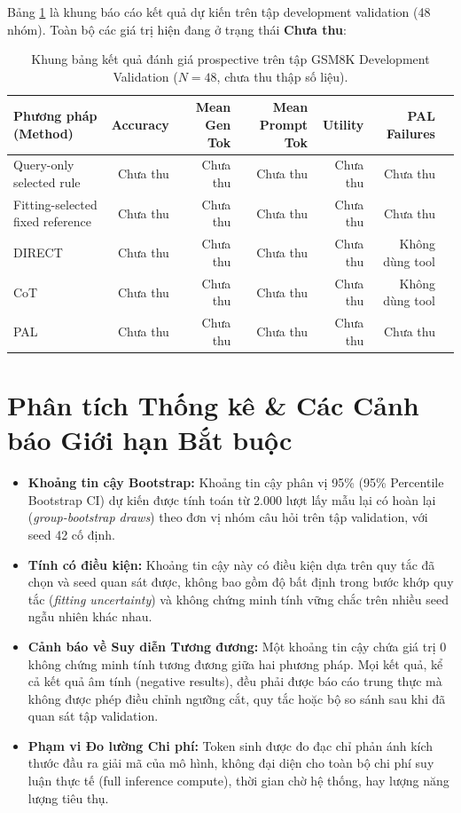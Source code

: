 \documentclass[11pt,a4paper]{report}
\begin{document}
Bảng \ref{tab:gsm8k_prospective_results} là khung báo cáo kết quả dự kiến trên tập development validation (48 nhóm). Toàn bộ các giá trị hiện đang ở trạng thái \textbf{Chưa thu}:

\begin{table}[h!]
\centering\small
\begin{tabularx}{\textwidth}{lrrrrrr}
\toprule
\textbf{Phương pháp (Method)} & \textbf{Accuracy} & \textbf{Mean Gen Tok} & \textbf{Mean Prompt Tok} & \textbf{Utility} & \textbf{PAL Failures} \\
\midrule
Query-only selected rule & Chưa thu & Chưa thu & Chưa thu & Chưa thu & Chưa thu \\
Fitting-selected fixed reference & Chưa thu & Chưa thu & Chưa thu & Chưa thu & Chưa thu \\
DIRECT & Chưa thu & Chưa thu & Chưa thu & Chưa thu & Không dùng tool \\
CoT & Chưa thu & Chưa thu & Chưa thu & Chưa thu & Không dùng tool \\
PAL & Chưa thu & Chưa thu & Chưa thu & Chưa thu & Chưa thu \\
\bottomrule
\end{tabularx}
\caption{Khung bảng kết quả đánh giá prospective trên tập GSM8K Development Validation ($N=48$, chưa thu thập số liệu).}\label{tab:gsm8k_prospective_results}
\end{table}

\section{Phân tích Thống kê \& Các Cảnh báo Giới hạn Bắt buộc}

\begin{itemize}[leftmargin=*]
    \item \textbf{Khoảng tin cậy Bootstrap:} Khoảng tin cậy phân vị 95\% (95\% Percentile Bootstrap CI) dự kiến được tính toán từ 2.000 lượt lấy mẫu lại có hoàn lại (\textit{group-bootstrap draws}) theo đơn vị nhóm câu hỏi trên tập validation, với seed 42 cố định.
    \item \textbf{Tính có điều kiện:} Khoảng tin cậy này có điều kiện dựa trên quy tắc đã chọn và seed quan sát được, không bao gồm độ bất định trong bước khớp quy tắc (\textit{fitting uncertainty}) và không chứng minh tính vững chắc trên nhiều seed ngẫu nhiên khác nhau.
    \item \textbf{Cảnh báo về Suy diễn Tương đương:} Một khoảng tin cậy chứa giá trị 0 không chứng minh tính tương đương giữa hai phương pháp. Mọi kết quả, kể cả kết quả âm tính (negative results), đều phải được báo cáo trung thực mà không được phép điều chỉnh ngưỡng cắt, quy tắc hoặc bộ so sánh sau khi đã quan sát tập validation.
    \item \textbf{Phạm vi Đo lường Chi phí:} Token sinh được đo đạc chỉ phản ánh kích thước đầu ra giải mã của mô hình, không đại diện cho toàn bộ chi phí suy luận thực tế (full inference compute), thời gian chờ hệ thống, hay lượng năng lượng tiêu thụ.
\end{itemize}
\end{document}
